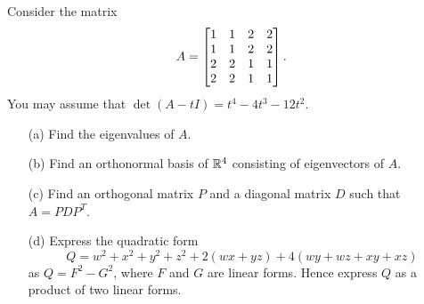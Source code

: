 \documentclass[a4paper]{article}
\begin{document}
\begin{problem}[2011-12]
 Consider the matrix
 \[ A = \left[\begin{matrix} 1&1&2&2 \\ 1&1&2&2 \\ 2&2&1&1 \\ 2&2&1&1 \end{matrix}\right]. \]
 You may assume that $\det(A-tI)=t^4-4t^3-12t^2$.
 \begin{itemize}
  \item[(a)] Find the eigenvalues of $A$. 
  \item[(b)] Find an orthonormal basis of ${\mathbb{R}}^4$ consisting of
   eigenvectors of $A$. 
  \item[(c)] Find an orthogonal matrix $P$ and a diagonal matrix $D$
   such that $A=PDP^T$. 
  \item[(d)] Express the quadratic form
   \[ Q = w^2+x^2+y^2+z^2 + 2(wx+yz) + 4(wy+wz+xy+xz) \] 
   as $Q=F^2-G^2$, where $F$ and $G$ are linear forms.  Hence express
   $Q$ as a product of two linear forms.  
 \end{itemize}
\end{problem}
\end{document}
